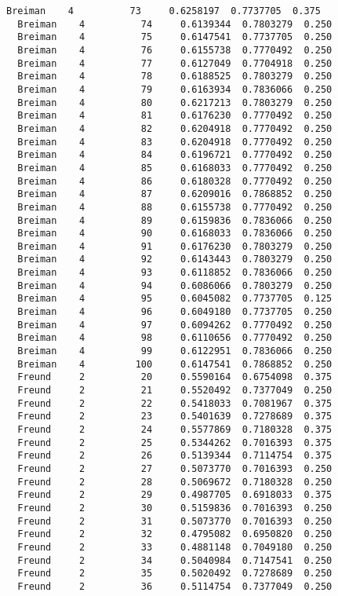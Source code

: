 \documentclass[11pt]{article}
\begin{document}
\begin{Verbatim}[commandchars=\\\{\}]
  Breiman    4          73     0.6258197  0.7737705  0.375
  Breiman    4          74     0.6139344  0.7803279  0.250
  Breiman    4          75     0.6147541  0.7737705  0.250
  Breiman    4          76     0.6155738  0.7770492  0.250
  Breiman    4          77     0.6127049  0.7704918  0.250
  Breiman    4          78     0.6188525  0.7803279  0.250
  Breiman    4          79     0.6163934  0.7836066  0.250
  Breiman    4          80     0.6217213  0.7803279  0.250
  Breiman    4          81     0.6176230  0.7770492  0.250
  Breiman    4          82     0.6204918  0.7770492  0.250
  Breiman    4          83     0.6204918  0.7770492  0.250
  Breiman    4          84     0.6196721  0.7770492  0.250
  Breiman    4          85     0.6168033  0.7770492  0.250
  Breiman    4          86     0.6180328  0.7770492  0.250
  Breiman    4          87     0.6209016  0.7868852  0.250
  Breiman    4          88     0.6155738  0.7770492  0.250
  Breiman    4          89     0.6159836  0.7836066  0.250
  Breiman    4          90     0.6168033  0.7836066  0.250
  Breiman    4          91     0.6176230  0.7803279  0.250
  Breiman    4          92     0.6143443  0.7803279  0.250
  Breiman    4          93     0.6118852  0.7836066  0.250
  Breiman    4          94     0.6086066  0.7803279  0.250
  Breiman    4          95     0.6045082  0.7737705  0.125
  Breiman    4          96     0.6049180  0.7737705  0.250
  Breiman    4          97     0.6094262  0.7770492  0.250
  Breiman    4          98     0.6110656  0.7770492  0.250
  Breiman    4          99     0.6122951  0.7836066  0.250
  Breiman    4         100     0.6147541  0.7868852  0.250
  Freund     2          20     0.5590164  0.6754098  0.375
  Freund     2          21     0.5520492  0.7377049  0.250
  Freund     2          22     0.5418033  0.7081967  0.375
  Freund     2          23     0.5401639  0.7278689  0.375
  Freund     2          24     0.5577869  0.7180328  0.375
  Freund     2          25     0.5344262  0.7016393  0.375
  Freund     2          26     0.5139344  0.7114754  0.375
  Freund     2          27     0.5073770  0.7016393  0.250
  Freund     2          28     0.5069672  0.7180328  0.250
  Freund     2          29     0.4987705  0.6918033  0.375
  Freund     2          30     0.5159836  0.7016393  0.250
  Freund     2          31     0.5073770  0.7016393  0.250
  Freund     2          32     0.4795082  0.6950820  0.250
  Freund     2          33     0.4881148  0.7049180  0.250
  Freund     2          34     0.5040984  0.7147541  0.250
  Freund     2          35     0.5020492  0.7278689  0.250
  Freund     2          36     0.5114754  0.7377049  0.250

\end{Verbatim}
\end{document}

